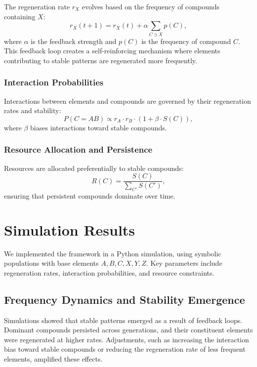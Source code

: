 \documentclass[entropy,article,submit,pdftex,moreauthors]{Definitions/mdpi}
\begin{document}
The regeneration rate \( r_X \) evolves based on the frequency of compounds containing \( X \):
\begin{equation}
r_X(t+1) = r_X(t) + \alpha \sum_{C \ni X} p(C),
\end{equation}
where \( \alpha \) is the feedback strength and \( p(C) \) is the frequency of compound \( C \). This feedback loop creates a self-reinforcing mechanism where elements contributing to stable patterns are regenerated more frequently.

\subsubsection{Interaction Probabilities}

Interactions between elements and compounds are governed by their regeneration rates and stability:
\begin{equation}
P(C = AB) \propto r_A \cdot r_B \cdot (1 + \beta \cdot S(C)),
\end{equation}
where \( \beta \) biases interactions toward stable compounds.

\subsubsection{Resource Allocation and Persistence}

Resources are allocated preferentially to stable compounds:
\begin{equation}
R(C) = \frac{S(C)}{\sum_{C'} S(C')},
\end{equation}
ensuring that persistent compounds dominate over time.

\section{Simulation Results}

We implemented the framework in a Python simulation, using symbolic populations with base elements \( A, B, C, X, Y, Z \). Key parameters include regeneration rates, interaction probabilities, and resource constraints. 

\subsection{Frequency Dynamics and Stability Emergence}

Simulations showed that stable patterns emerged as a result of feedback loops. Dominant compounds persisted across generations, and their constituent elements were regenerated at higher rates. Adjustments, such as increasing the interaction bias toward stable compounds or reducing the regeneration rate of less frequent elements, amplified these effects.
\end{document}
